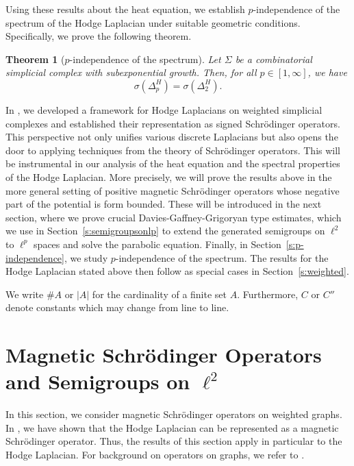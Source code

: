\documentclass[10pt]{amsart}
\newtheorem{theorem}{Theorem}[section]
\theoremstyle{definition}
\begin{document}
Using these results about the heat equation, we establish $p$-independence of the spectrum of the Hodge Laplacian under suitable geometric conditions. Specifically, we prove the following theorem.

\begin{theorem}
[$p$-independence of the spectrum]\label{thm:p-independence}
    Let $  \Sigma$ be a combinatorial simplicial complex with %
    subexponential growth. Then, for all 
    $p\in [1,\infty]$, we have
    \[\sigma(\Delta^H_p) = \sigma(\Delta^H_2).\]
\end{theorem}



In \cite{BK}, we developed a framework for Hodge Laplacians on weighted simplicial complexes and established their representation as signed Schrödinger operators. This perspective not only unifies various discrete Laplacians but also opens the door to applying techniques from the theory of Schrödinger operators. This will be instrumental in our analysis of the heat equation and the spectral properties of the Hodge Laplacian. More precisely, we will prove the results above in the more general setting of positive magnetic Schrödinger operators whose negative part of the potential is form bounded. These will be introduced in the next section, where we prove crucial Davies-Gaffney-Grigoryan type estimates, which we use in Section~\ref{s:semigroupsonlp} to extend the generated semigroups on $\ell^2$ to $\ell^p$ spaces and solve the parabolic equation. Finally, in Section~\ref{s:p-independence}, we study $p$-independence of the spectrum. The results for the Hodge Laplacian stated above then follow as special cases in 
Section~\ref{s:weighted}.

We write $\#A$ or $|A|$ for the cardinality of a finite set $A$. Furthermore, $C$ or $C''$ denote constants which may change from line to line.

\section{Magnetic Schrödinger Operators and Semigroups on $\ell^2$}\label{s:magneticschrodinger} 
In this section, we consider magnetic Schrödinger operators on weighted graphs.  In \cite{BK}, we have shown that the Hodge Laplacian can be represented as a magnetic Schrödinger operator. Thus, the results of this section apply in particular to the Hodge Laplacian. 
For background on operators on graphs, we refer to \cite{KLW, GKS,S}.
\end{document}
